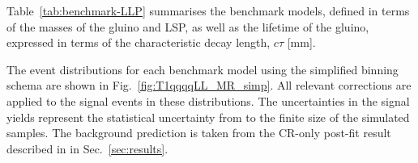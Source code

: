 Table~\ref{tab:benchmark-LLP} summarises the benchmark models, defined
in terms of the masses of the gluino and LSP, as well as the lifetime
of the gluino, expressed in terms of the characteristic decay length,
$c\tau$ [mm].

The event distributions for each benchmark model using the simplified
binning schema are shown in Fig.~\ref{fig:T1qqqqLL_MR_simp}. All
relevant corrections are applied to the signal events in these
distributions. The uncertainties in the signal yields represent the
statistical uncertainty from to the finite size of the simulated
samples. The background prediction is taken from the CR-only post-fit
result described in in Sec.~\ref{sec:results}.

\begin{figure}[!ht]
    \centering
     ~~
     \\
\end{figure}
